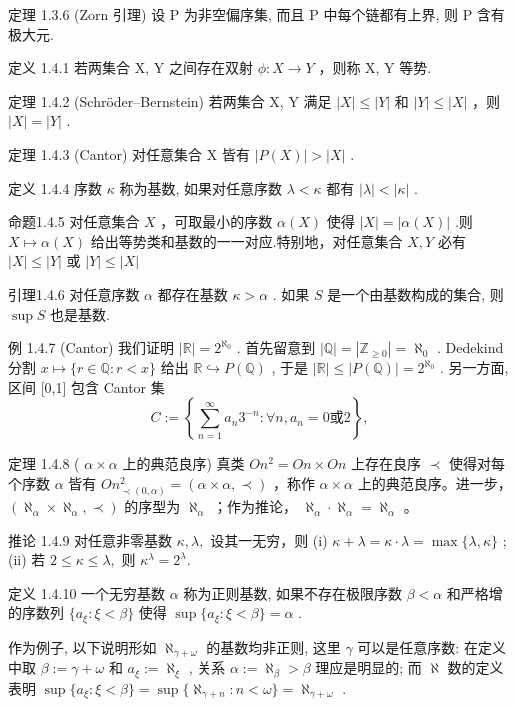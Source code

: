 \documentclass[]{article}
\begin{document}
定理 1.3.6 (Zorn 引理) 设 P 为非空偏序集, 而且 P 中每个链都有上界, 则 P 含有极大元. 

定义 1.4.1 若两集合 X, Y 之间存在双射 $\phi: X \rightarrow Y$ ，则称 X, Y 等势. 

定理 1.4.2 (Schröder–Bernstein) 若两集合 X, Y 满足 $|X| \leq |Y|$ 和 $|Y| \leq |X|$ ，则 $|X| = |Y|$ . 

定理 1.4.3 (Cantor) 对任意集合 X 皆有 $|P(X)| > |X|$ . 

定义 1.4.4 序数 $\kappa$ 称为基数, 如果对任意序数 $\lambda < \kappa$ 都有 $|\lambda| < |\kappa|$ . 

命题1.4.5 对任意集合 $X$ ，可取最小的序数 $\alpha (X)$ 使得 $|X| = |\alpha (X)|$ .则 $X\mapsto \alpha (X)$ 给出等势类和基数的一一对应.特别地，对任意集合 $X,Y$ 必有 $|X|\leq |Y|$ 或 $|Y|\leq |X|$ 

引理1.4.6 对任意序数 $\alpha$ 都存在基数 $\kappa > \alpha$ . 如果 $S$ 是一个由基数构成的集合, 则 $\sup S$ 也是基数. 

例 1.4.7 (Cantor) 我们证明 $|\mathbb{R}| = 2^{\aleph_{0}}$ . 首先留意到 $|\mathbb{Q}| = |\mathbb{Z}_{\geq 0}| = \aleph_{0}$ . Dedekind 分割 $x \mapsto \{r \in \mathbb{Q} : r < x\}$ 给出 $\mathbb{R} \hookrightarrow P(\mathbb{Q})$ , 于是 $|\mathbb{R}| \leq |P(\mathbb{Q})| = 2^{\aleph_{0}}$ . 另一方面, 区间 [0,1] 包含 Cantor 集 $$
C := \left\{\sum_ {n = 1} ^ {\infty} a _ {n} 3 ^ {- n}: \forall n,   a _ {n} = 0   \text {或}   2 \right\},
$$

定理 1.4.8 ( $\alpha \times \alpha$ 上的典范良序) 真类 $On^{2} = On \times On$ 上存在良序 $\prec$ 使得对每个序数 $\alpha$ 皆有 $On_{\prec(0,\alpha)}^{2} = (\alpha \times \alpha, \prec)$ ，称作 $\alpha \times \alpha$ 上的典范良序。进一步， $(\aleph_{\alpha} \times \aleph_{\alpha}, \prec)$ 的序型为 $\aleph_{\alpha}$ ；作为推论， $\aleph_{\alpha} \cdot \aleph_{\alpha} = \aleph_{\alpha}$ 。 

推论 1.4.9 对任意非零基数 $\kappa, \lambda,$ 设其一无穷，则 (i) $\kappa + \lambda = \kappa \cdot \lambda = \max\{\lambda, \kappa\}$ ; (ii) 若 $2 \leq \kappa \leq \lambda,$ 则 $\kappa^{\lambda} = 2^{\lambda}.$ 

定义 1.4.10 一个无穷基数 $\alpha$ 称为正则基数, 如果不存在极限序数 $\beta < \alpha$ 和严格增的序数列 $\{a_{\xi} : \xi < \beta\}$ 使得 $\sup\{a_{\xi} : \xi < \beta\} = \alpha$ . 

作为例子, 以下说明形如 $\aleph_{\gamma + \omega}$ 的基数均非正则, 这里 $\gamma$ 可以是任意序数: 在定义中取 $\beta := \gamma + \omega$ 和 $a_{\xi} := \aleph_{\xi}$ , 关系 $\alpha := \aleph_{\beta} > \beta$ 理应是明显的; 而 $\aleph$ 数的定义表明 $\sup \{a_{\xi} : \xi < \beta\} = \sup \{\aleph_{\gamma + n} : n < \omega\} = \aleph_{\gamma + \omega}$ . 
\end{document}
